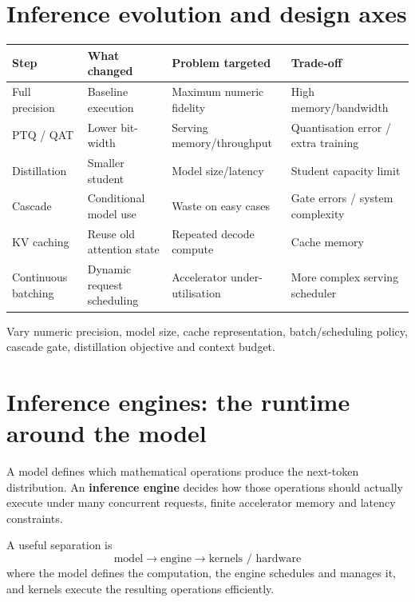 \section{Inference evolution and design axes}
\label{sec:inference-evolution}
\begin{center}
\small
\begin{tabularx}{.97\linewidth}{@{}L{.18\linewidth}L{.22\linewidth}YY@{}}
\toprule
\textbf{Step} & \textbf{What changed} & \textbf{Problem targeted} & \textbf{Trade-off} \\
\midrule
Full precision & Baseline execution & Maximum numeric fidelity & High memory/bandwidth \\
PTQ / QAT & Lower bit-width & Serving memory/throughput & Quantisation error / extra training \\
Distillation & Smaller student & Model size/latency & Student capacity limit \\
Cascade & Conditional model use & Waste on easy cases & Gate errors / system complexity \\
KV caching & Reuse old attention state & Repeated decode compute & Cache memory \\
Continuous batching & Dynamic request scheduling & Accelerator under-utilisation & More complex serving scheduler \\
\bottomrule
\end{tabularx}
\end{center}

\begin{calloutdegreeofexperiment}
Vary numeric precision, model size, cache representation, batch/scheduling policy, cascade gate, distillation objective and context budget.
\end{calloutdegreeofexperiment}




\section{Inference engines: the runtime around the model}
\label{sec:inference-engines}
A model defines which mathematical operations produce the next-token distribution.
An \textbf{inference engine} decides how those operations should actually execute under many concurrent requests, finite accelerator memory and latency constraints.

A useful separation is
\[
\boxed{
\text{model}
\rightarrow
\text{engine}
\rightarrow
\text{kernels / hardware}
}
\]
where the model defines the computation, the engine schedules and manages it, and kernels execute the resulting operations efficiently.


